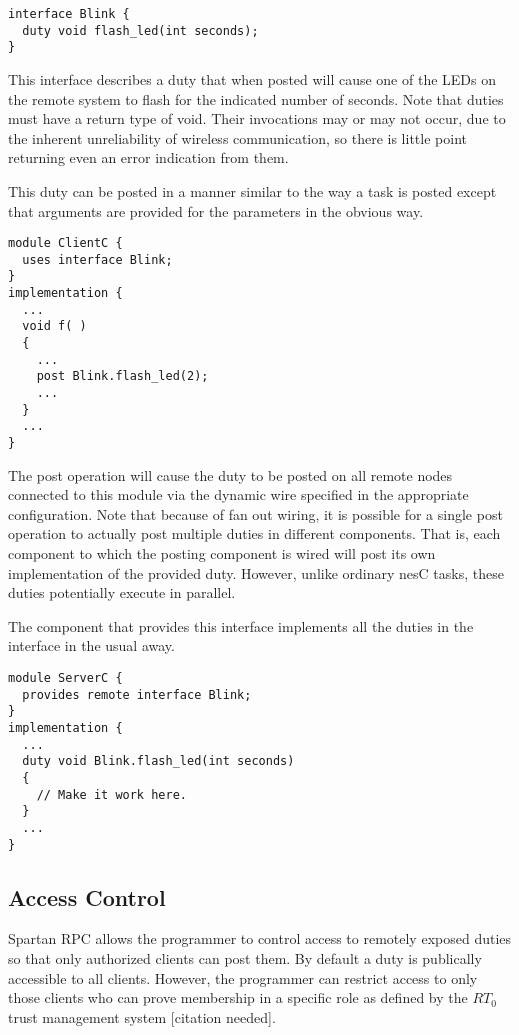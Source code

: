 \begin{verbatim}
interface Blink {
  duty void flash_led(int seconds);
}
\end{verbatim}

This interface describes a duty that when posted will cause one of the LEDs on the remote system
to flash for the indicated number of seconds. Note that duties must have a return type of void.
Their invocations may or may not occur, due to the inherent unreliability of wireless
communication, so there is little point returning even an error indication from them.

This duty can be posted in a manner similar to the way a task is posted except that arguments
are provided for the parameters in the obvious way.

\begin{verbatim}
module ClientC {
  uses interface Blink;
}
implementation {
  ...
  void f( )
  {
    ...
    post Blink.flash_led(2);
    ...
  }
  ...
}
\end{verbatim}

The post operation will cause the duty to be posted on all remote nodes connected to this module
via the dynamic wire specified in the appropriate configuration. Note that because of fan out
wiring, it is possible for a single post operation to actually post multiple duties in different
components. That is, each component to which the posting component is wired will post its own
implementation of the provided duty. However, unlike ordinary nesC tasks, these duties
potentially execute in parallel.

The component that provides this interface implements all the duties in the interface in the
usual away.

\begin{verbatim}
module ServerC {
  provides remote interface Blink;
}
implementation {
  ...
  duty void Blink.flash_led(int seconds)
  {
    // Make it work here.
  }
  ...
}
\end{verbatim}

\subsection{Access Control}
\label{sec:access-control}

Spartan RPC allows the programmer to control access to remotely exposed duties so that only
authorized clients can post them. By default a duty is publically accessible to all clients.
However, the programmer can restrict access to only those clients who can prove membership in a
specific role as defined by the $RT_0$ trust management system [citation needed].

